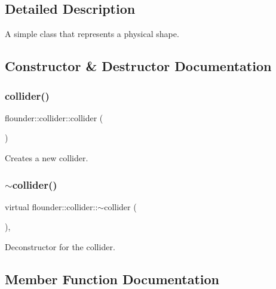 \subsection{Detailed Description}
A simple class that represents a physical shape. 



\subsection{Constructor \& Destructor Documentation}
\mbox{\label{classflounder_1_1collider_ab5398fd751ea6beaeb3d85777633392b}} 
\subsubsection{\texorpdfstring{collider()}{collider()}}
{\footnotesize\ttfamily flounder\+::collider\+::collider (\begin{DoxyParamCaption}{ }\end{DoxyParamCaption})\hspace{0.3cm}{\ttfamily [inline]}}



Creates a new collider. 

\mbox{\label{classflounder_1_1collider_a4d79dbd4483027db6d7080887bcf26e6}} 
\subsubsection{\texorpdfstring{$\sim$collider()}{~collider()}}
{\footnotesize\ttfamily virtual flounder\+::collider\+::$\sim$collider (\begin{DoxyParamCaption}{ }\end{DoxyParamCaption})\hspace{0.3cm}{\ttfamily [inline]}, {\ttfamily [virtual]}}



Deconstructor for the collider. 



\subsection{Member Function Documentation}
\mbox{\label{classflounder_1_1collider_ae185e877868e8783e28e8d74120f2f2b}} 

